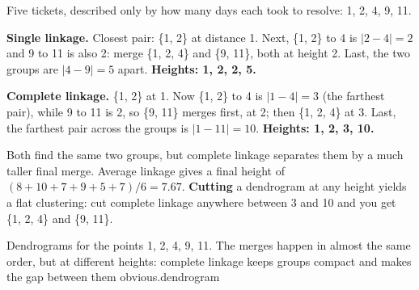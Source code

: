 \begin{worked}
Five tickets, described only by how many days each took to resolve: 1, 2, 4, 9, 11.

\smallskip
\textbf{Single linkage.} Closest pair: \{1, 2\} at distance 1. Next, \{1, 2\} to 4 is
$|2 - 4| = 2$ and 9 to 11 is also 2: merge \{1, 2, 4\} and \{9, 11\}, both at height
2. Last, the two groups are $|4 - 9| = 5$ apart. \textbf{Heights: 1, 2, 2, 5.}

\textbf{Complete linkage.} \{1, 2\} at 1. Now \{1, 2\} to 4 is $|1 - 4| = 3$ (the
farthest pair), while 9 to 11 is 2, so \{9, 11\} merges first, at 2; then
\{1, 2, 4\} at 3. Last, the farthest pair across the groups is $|1 - 11| = 10$.
\textbf{Heights: 1, 2, 3, 10.}

\smallskip
Both find the same two groups, but complete linkage separates them by a much taller
final merge. Average linkage gives a final height of $(8 + 10 + 7 + 9 + 5 + 7)/6 =
7.67$. \textbf{Cutting} a dendrogram at any height yields a flat clustering: cut
complete linkage anywhere between 3 and 10 and you get \{1, 2, 4\} and \{9, 11\}.
\end{worked}

%
{Dendrograms for the points 1, 2, 4, 9, 11. The merges happen in almost the same order, but
at different heights: complete linkage keeps groups compact and makes the gap between them
obvious.}{dendrogram}

